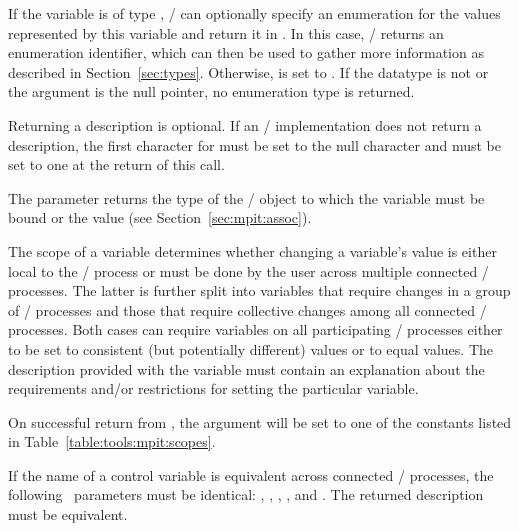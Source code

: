 If the variable is of type , \MPI/ can optionally specify
an enumeration for the values represented by this variable and return it in
.  In this case, \MPI/ returns an enumeration identifier,
which can then be used to gather more information as described in
Section~\ref{sec:types}.  Otherwise,  is set to
.  If the datatype is not  or the
argument  is the null pointer, no enumeration type is
returned.


Returning a description is optional.  If an \mpi/ implementation does not
return a description, the first character for  must be set to
the null character and  must be set to one at the return
of this call.

The parameter  returns the type of the \MPI/ object to which
the variable must be bound or the value 
(see Section~\ref{sec:mpit:assoc}).

The scope of a variable determines whether changing a variable's value is
either local to the \MPI/ process or must be done by the user across multiple
connected \MPI/ processes.  The latter is further split into variables that require changes
in a group of \MPI/ processes and those that require collective changes among all
connected \MPI/ processes.  Both cases can require variables on all participating \MPI/ processes either to be set
to consistent (but potentially different) values or to equal values.
The description provided with the variable
must contain an explanation about the requirements and/or restrictions for
setting the particular variable.

On successful return from , the argument
 will be set to one of the constants listed in
Table~\ref{table:tools:mpit:scopes}.

If the name of a control variable is equivalent across connected \MPI/ processes,
the following \OUT\  parameters must be identical:
, , , ,
and .  The returned description must be equivalent.

